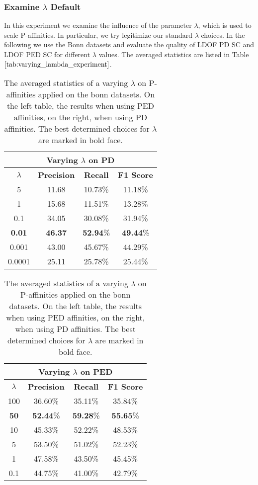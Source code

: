 \subsubsection{Examine $\lambda$ Default}
In this experiment we examine the influence of the parameter $\lambda$, which is used to scale P-affinities. In particular, we try legitimize our standard $\lambda$ choices. In the following we use the Bonn datasets and evaluate the quality of LDOF PD SC and LDOF PED SC for different $\lambda$ values. The averaged statistics are listed in Table $\ref{tab:varying_lambda_experiment}$.
\begin{table}[H]
\centering
\setlength\tabcolsep{4pt}
\begin{minipage}{0.48\textwidth}
\centering
\begin{tabular}{|c|c|c|c|}
\hline
\multicolumn{4}{|c|}{Varying $\lambda$ on PD} \\ \hline
$\lambda$ & \textbf{Precision} & \textbf{Recall} & \textbf{F1 Score} \\ \hline
5 & 11.68 & 10.73\% & 11.18\%  \\ \hline
1 & 15.68 & 11.51\% & 13.28\%  \\ \hline
0.1 & 34.05 & 30.08\% & 31.94\%  \\ \hline
\textbf{0.01} & \textbf{46.37} & \textbf{52.94}\% & \textbf{49.44}\%  \\ \hline
0.001 & 43.00 & 45.67\% & 44.29\%  \\ \hline
0.0001 & 25.11 & 25.78\% & 25.44\%  \\ \hline
\end{tabular}
\end{minipage}%
\hfill
\begin{minipage}{0.48\textwidth}
\centering
\begin{tabular}{|c|c|c|c|}
\hline
\multicolumn{4}{|c|}{Varying $\lambda$ on PED}                        \\ \hline
$\lambda$ & \textbf{Precision} & \textbf{Recall} & \textbf{F1 Score} \\ \hline
100 & 36.60\% & 35.11\% & 35.84\%  \\ \hline
\textbf{50} & \textbf{52.44}\% & \textbf{59.28}\% & \textbf{55.65}\%  \\ \hline
10 & 45.33\% & 52.22\% & 48.53\%  \\ \hline
5 & 53.50\% & 51.02\% & 52.23\%  \\ \hline
1 & 47.58\% & 43.50\% & 45.45\%  \\ \hline
0.1 & 44.75\% & 41.00\% & 42.79\%  \\ \hline
\end{tabular}
\end{minipage}
\caption[Experiment Varying $\lambda$]{The averaged statistics of a varying $\lambda$ on P-affinities applied on the bonn datasets. On the left table, the results when using PED affinities, on the right, when using PD affinities. The best determined choices for $\lambda$ are marked in bold face.}
\label{tab:varying_lambda_experiment}
\end{table}
